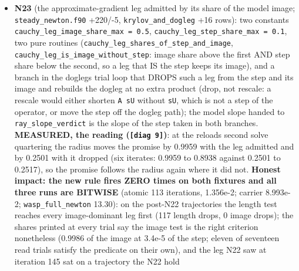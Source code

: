 \documentclass[english,a4paper]{my_memo}
\begin{document}
\begin{itemize}
  as a mid-run relaxation snapshot (3.2e-3 against 1e-8; the same pair
  evaluated by the entry and the N10b binary is bitwise, so not N10b\textquotesingle s);
  the advisor pinned the certified state as
  \texttt{backup/regression/wasp\_full\_newton/IC/} (copied from the golden,
  \texttt{certified=T}, README there) and pointed the row at it. Reported:
  \texttt{restart\_grid\_guard.sh}\textquotesingle s stale header (third time); \texttt{sec\_ion\_step=0} on a
  re-evaluated state; whether \texttt{molbase}, \texttt{he\_diff}, \texttt{he\_metal\_diff} belong
  with the layout tokens is a reviewer\textquotesingle s question (the worker\textquotesingle s reading:
  they add operators, not rows).
\item
  \textbf{N23} (the approximate-gradient leg admitted by its share of the model
  image; \texttt{steady\_newton.f90} +220/-5, \texttt{krylov\_and\_dogleg} +16 rows): two
  constants \texttt{cauchy\_leg\_image\_share\_max\ =\ 0.5}, \texttt{cauchy\_leg\_step\_share\_max\ =\ 0.1}, two pure routines (\texttt{cauchy\_leg\_shares\_of\_step\_and\_image},
  \texttt{cauchy\_leg\_is\_image\_without\_step}: image share above the first AND step
  share below the second, so a leg that IS the step keeps its image), and a
  branch in the dogleg\textquotesingle s trial loop that DROPS such a leg from the step and
  its image and rebuilds the dogleg at no extra product (drop, not rescale:
  a rescale would either shorten \texttt{A\ sU} without \texttt{sU}, which is not a step of
  the operator, or move the step off the dogleg path); the model slope
  handed to \texttt{ray\_slope\_verdict} is the slope of the step taken in both
  branches. \textbf{MEASURED, the reading (\texttt{{[}diag\ 9{]}})}: at the reload\textquotesingle s second
  solve quartering the radius moves the promise by 0.9959 with the leg
  admitted and by 0.2501 with it dropped (six iterates: 0.9959 to 0.8938
  against 0.2501 to 0.2517), so the promise follows the radius again where it
  did not. \textbf{Honest impact: the new rule fires ZERO times on both fixtures
  and all three runs are BITWISE} (atomic 113 iterations, 1.356e-2;
  carrier 8.993e-2; \texttt{wasp\_full\_newton} 13.30): on the post-N22 trajectories
  the length test reaches every image-dominant leg first (117 length drops,
  0 image drops); the shares printed at every trial say the image test is
  the right criterion nonetheless (0.9986 of the image at 3.4e-5 of the
  step; eleven of seventeen read trials satisfy the predicate on their own),
  and the leg N22 saw at iteration 145 sat on a trajectory the N22 hold

\end{itemize}
\end{document}
